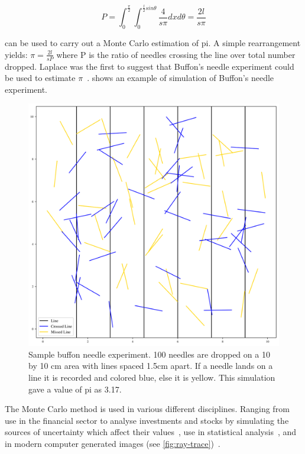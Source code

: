 \begin{equation}
P=\int_0^{\frac{\pi}{2}}\int_0^{\frac{l}{2}sin\theta}\frac{4}{s\pi}dx d\theta = \frac{2 l}{s \pi}\label{eqn:buffon}
\end{equation}


 can be used to carry out a Monte Carlo estimation of pi. A simple rearrangement yields: $\pi = \tfrac{2l}{sP}$ where P is the ratio of needles crossing the line over total number dropped. Laplace was the first to suggest that Buffon's needle experiment could be used to estimate $\pi$~\cite{beckmann2015history}.  shows an example of simulation of Buffon's needle experiment.

\begin{figure}
\centering
\includegraphics[width=\columnwidth/2]{./MCRT/images/buffon-pi=317.pdf}
\caption{Sample buffon needle experiment. 100 needles are dropped on a 10 by 10 cm area with lines spaced 1.5cm apart. If a needle lands on a line it is recorded and colored blue, else it is yellow. This simulation gave a value of pi as 3.17.}
\label{fig:buffon-needle}
\end{figure}

The Monte Carlo method is used in various different disciplines. Ranging from use in the financial sector to analyse investments and stocks by simulating the sources of uncertainty which affect their values~\cite{jackel2002monte,finaceprrof}, use in statistical analysis~\cite{wall2012practical}, and in modern computer generated images (see \cref{fig:ray-trace})~\cite{Kajiyarendering,Cookraytracing}.

